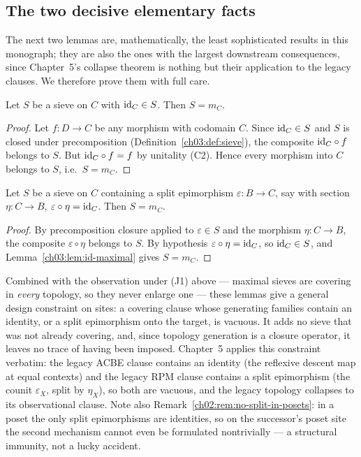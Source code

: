 \subsection{The two decisive elementary facts}\label{ch03:sec:decisive}

The next two lemmas are, mathematically, the least sophisticated
results in this monograph; they are also the ones with the largest
downstream consequences, since Chapter~5's collapse theorem is
nothing but their application to the legacy clauses. We therefore
prove them with full care.

\begin{lemma}\label{ch03:lem:id-maximal}
Let $S$ be a sieve on $C$ with $\mathrm{id}_C \in S$. Then $S = m_C$.
\end{lemma}

\begin{proof}
Let $f : D \to C$ be any morphism with codomain $C$. Since
$\mathrm{id}_C \in S$ and $S$ is closed under precomposition
(Definition~\ref{ch03:def:sieve}), the composite
$\mathrm{id}_C \circ f$ belongs to $S$. But $\mathrm{id}_C \circ f = f$ by
unitality (C2). Hence every morphism into $C$ belongs to $S$, i.e.\
$S = m_C$.
\end{proof}

\begin{lemma}\label{ch03:lem:splitepi-maximal}
Let $S$ be a sieve on $C$ containing a split epimorphism
$\varepsilon : B \to C$, say with section $\eta : C \to B$,
$\varepsilon \circ \eta = \mathrm{id}_C$. Then $S = m_C$.
\end{lemma}

\begin{proof}
By precomposition closure applied to $\varepsilon \in S$ and the
morphism $\eta : C \to B$, the composite
$\varepsilon \circ \eta$ belongs to $S$. By hypothesis
$\varepsilon \circ \eta = \mathrm{id}_C$, so $\mathrm{id}_C \in S$, and
Lemma~\ref{ch03:lem:id-maximal} gives $S = m_C$.
\end{proof}

\begin{remark}\label{ch03:rem:decisive-consequence}
Combined with the observation under (J1) above --- maximal sieves
are covering in \emph{every} topology, so they never enlarge one
--- these lemmas give a general design constraint on sites: a
covering clause whose generating families contain an identity, or
a split epimorphism onto the target, is vacuous. It adds no sieve
that was not already covering, and, since topology generation is a
closure operator, it leaves no trace of having been imposed.
Chapter~5 applies this constraint verbatim: the legacy ACBE clause
contains an identity (the reflexive descent map at equal contexts)
and the legacy RPM clause contains a split epimorphism (the counit
$\varepsilon_X$, split by $\eta_X$), so both are vacuous, and the
legacy topology collapses to its observational clause. Note also
Remark~\ref{ch02:rem:no-split-in-posets}: in a poset the only
split epimorphisms are identities, so on the successor's poset
site the second mechanism cannot even be formulated nontrivially
--- a structural immunity, not a lucky accident.
\end{remark}

